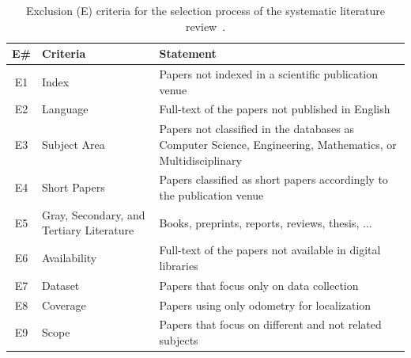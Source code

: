 \begin{table}[t]
  \caption[Exclusion (E) criteria for the selection process of the systematic literature review]{Exclusion (E) criteria for the selection process of the systematic literature review~\cite{sousa:jfr:2023}.}
  \label{tab:literature:systematic:method:exclusion-criteria}
  \centering
  \begin{tabular}{c m{} m{}}

\hline
\textbf{E\#} & \textbf{Criteria} & \textbf{Statement}\\
\hline
E1 &
Index &
Papers not indexed in a scientific publication venue\\
\hline
E2 &
Language &
Full-text of the papers not published in English\\
\hline
E3 &
Subject Area &
Papers not classified in the databases as Computer Science, Engineering, Mathematics, or Multidisciplinary\\
\hline
E4 &
Short Papers &
Papers classified as short papers accordingly to the publication venue\\
\hline
E5 &
Gray, Secondary, and Tertiary Literature &
Books, preprints, reports, reviews, thesis, ...\\
\hline
E6 &
Availability &
Full-text of the papers not available in digital libraries\\
\hline
E7 &
Dataset &
Papers that focus only on data collection\\
\hline
E8 &
Coverage &
Papers using only odometry for localization\\
\hline
E9 &
Scope &
Papers that focus on different and not related subjects\\
\hline

  \end{tabular}
\end{table}
